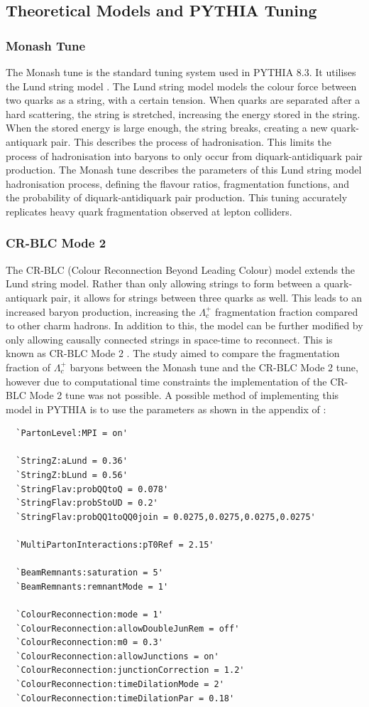 \documentclass[12pt]{article}
\begin{document}
\subsection{Theoretical Models and PYTHIA Tuning}

\subsubsection{Monash Tune}
The Monash tune \cite{monash} is the standard tuning system used in PYTHIA 8.3. It utilises the Lund string model \cite{lundmodel}. The Lund string model models the colour force between two quarks as a string, with a certain tension. When quarks are separated after a hard scattering, the string is stretched, increasing the energy stored in the string. When the stored energy is large enough, the string breaks, creating a new quark-antiquark pair. This describes the process of hadronisation. This limits the process of hadronisation into baryons to only occur from diquark-antidiquark pair production. The Monash tune describes the parameters of this Lund string model hadronisation process, defining the flavour ratios, fragmentation functions, and the probability of diquark-antidiquark pair production. This tuning accurately replicates heavy quark fragmentation observed at lepton colliders.

\subsubsection{CR-BLC Mode 2}
The CR-BLC (Colour Reconnection Beyond Leading Colour) model extends the Lund string model. Rather than only allowing strings to form between a quark-antiquark pair, it allows for strings between three quarks as well. This leads to an increased baryon production, increasing the $\Lambda_c^+$ fragmentation fraction compared to other charm hadrons. In addition to this, the model can be further modified by only allowing causally connected strings in space-time to reconnect. This is known as CR-BLC Mode 2 \cite{crblc}. The study aimed to compare the fragmentation fraction of $\Lambda_c^+$ baryons between the Monash tune and the CR-BLC Mode 2 tune, however due to computational time constraints the implementation of the CR-BLC Mode 2 tune was not possible. A possible method of implementing this model in PYTHIA is to use the parameters as shown in the appendix of \cite{crblc}:
\begin{verbatim}
  `PartonLevel:MPI = on'

  `StringZ:aLund = 0.36'
  `StringZ:bLund = 0.56'
  `StringFlav:probQQtoQ = 0.078'
  `StringFlav:probStoUD = 0.2'
  `StringFlav:probQQ1toQQ0join = 0.0275,0.0275,0.0275,0.0275'

  `MultiPartonInteractions:pT0Ref = 2.15'

  `BeamRemnants:saturation = 5'
  `BeamRemnants:remnantMode = 1'

  `ColourReconnection:mode = 1'
  `ColourReconnection:allowDoubleJunRem = off'
  `ColourReconnection:m0 = 0.3'
  `ColourReconnection:allowJunctions = on'
  `ColourReconnection:junctionCorrection = 1.2'
  `ColourReconnection:timeDilationMode = 2'
  `ColourReconnection:timeDilationPar = 0.18'
\end{verbatim}
\end{document}
